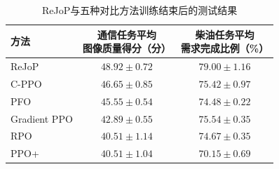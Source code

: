 \begin{table}[H]
 \centering
 \captionsetup{skip=8bp,belowskip=0pt}
 \caption{ReJoP与五种对比方法训练结束后的测试结果}
 \label{tab:formal-ch3-main}
 \begin{tabular}{lcc}
  \toprule
  方法 & \shortstack{通信任务平均\\图像质量得分（分）} & \shortstack{柴油任务平均\\需求完成比例（\%）} \\
  \midrule
  ReJoP & \(48.92\pm0.72\) & \(79.00\pm1.16\) \\
  C-PPO & \(46.65\pm0.85\) & \(75.42\pm0.97\) \\
  PFO & \(45.55\pm0.54\) & \(74.48\pm0.22\) \\
  Gradient PPO & \(42.89\pm0.55\) & \(75.54\pm0.35\) \\
  RPO & \(40.51\pm1.14\) & \(74.67\pm0.35\) \\
  PPO+ & \(40.51\pm1.04\) & \(70.15\pm0.69\) \\
  \bottomrule
 \end{tabular}
\end{table}
